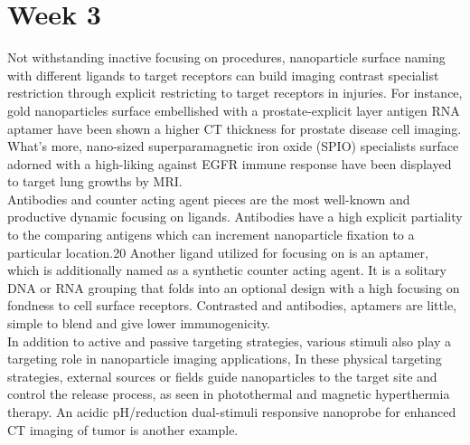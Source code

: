 \documentclass{article}
\begin{document}
\section*{Week 3}
Not withstanding inactive focusing on procedures, nanoparticle surface naming with different ligands to target receptors can build imaging contrast specialist restriction through explicit restricting to target receptors in injuries. For instance, gold nanoparticles surface embellished with a prostate-explicit layer antigen RNA aptamer have been shown a higher CT thickness for prostate disease cell imaging. What's more, nano-sized superparamagnetic iron oxide (SPIO) specialists surface adorned with a high-liking against EGFR immune response have been displayed to target lung growths by MRI.\\Antibodies and counter acting agent pieces are the most well-known and productive dynamic focusing on ligands. Antibodies have a high explicit partiality to the comparing antigens which can increment nanoparticle fixation to a particular location.20 Another ligand utilized for focusing on is an aptamer, which is additionally named as a synthetic counter acting agent. It is a solitary DNA or RNA grouping that folds into an optional design with a high focusing on fondness to cell surface receptors. Contrasted and antibodies, aptamers are little, simple to blend and give lower immunogenicity.\\ In addition to active and passive targeting strategies, various stimuli also play a targeting role in nanoparticle imaging applications, In these physical targeting strategies, external sources or fields guide nanoparticles to the target site and control the release process, as seen in photothermal and magnetic hyperthermia therapy. An acidic pH/reduction dual-stimuli responsive nanoprobe for enhanced CT imaging of tumor is another example.


 
  
\end{document}
